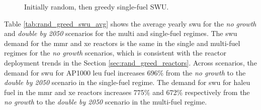 \begin{figure}[H]
    \hfill
    \caption{Initially random, then greedy single-fuel SWU.}
    \label{fig:rand_greed_of_swu}
\end{figure}


Table \ref{tab:rand_greed_swu_avg} shows the average yearly \gls{swu} for the \textit{no growth} and \textit{double by 2050} scenarios for the multi and single-fuel regimes. The \gls{swu} demand for the \gls{mmr} and \gls{xe} reactors is the same in the single and multi-fuel regimes for the \textit{no growth} scenarios, which is consistent with the reactor deployment trends in the Section \ref{sec:rand_greed_reactors}. Across scenarios, the demand for \gls{swu} for AP1000 \gls{leu} fuel increases 696\% from the \textit{no growth} to the \textit{double by 2050} scenario in the single-fuel regime. The demand for \gls{swu} for \gls{haleu} fuel in the \gls{mmr} and \gls{xe} reactors increases 775\% and 672\% respectively from the \textit{no growth} to the \textit{double by 2050} scenario in the multi-fuel regime.

